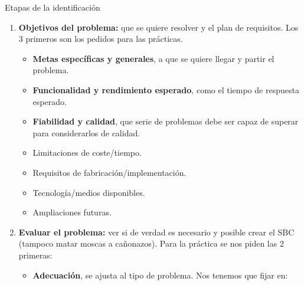 \documentclass[12pt, twoside, openright]{report} %
\begin{document}
Etapas de la identificación
\begin{enumerate}
	\item \textbf{Objetivos del problema:} que se quiere resolver y el plan de requisitos. Los 3 primeros son los pedidos para las prácticas.
	      \begin{itemize}
		      \item \textbf{Metas específicas y generales}, a que se quiere llegar y partir el problema.
		      \item \textbf{Funcionalidad y rendimiento esperado}, como el tiempo de respuesta esperado.
		      \item \textbf{Fiabilidad y calidad}, que serie de problemas debe ser capaz de superar para considerarlos de calidad.
		      \item Limitaciones de coste/tiempo.
		      \item Requisitos de fabricación/implementación.
		      \item Tecnología/medios disponibles.
		      \item Ampliaciones futuras.
	      \end{itemize}
	      \pagebreak
	      
	\item \textbf{Evaluar el problema:} ver si de verdad es necesario y posible crear el SBC (tampoco matar moscas a cañonazos). Para la práctica se nos piden las 2 primeras:
	      \begin{itemize}
		      \item \textbf{Adecuación}, se ajusta al tipo de problema. Nos tenemos que fijar en:
		            

\end{itemize}
\end{enumerate}
\end{document}
